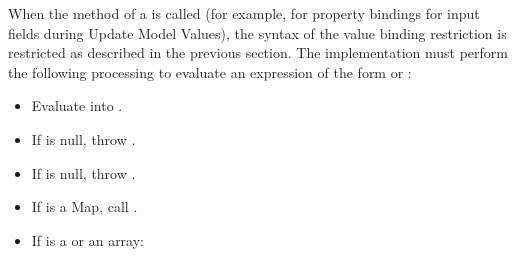 \foreignlanguage{english}{When the
}\foreignlanguage{english}{
method of a
}\foreignlanguage{english}{
is called (for example, for
}\foreignlanguage{english}{
property bindings for input fields during Update Model Values), the
syntax of the value binding restriction is restricted as described in
the previous section. The implementation must perform the following
processing to evaluate an expression of the form
}\foreignlanguage{english}{
or
}\foreignlanguage{english}{:}

\liststyleWWNumx
\begin{itemize}
\item \foreignlanguage{english}{Evaluate
}\foreignlanguage{english}{
into
}\foreignlanguage{english}{.
}
\item \foreignlanguage{english}{If
}\foreignlanguage{english}{
is null, throw
}\foreignlanguage{english}{.
}
\item \foreignlanguage{english}{If
}\foreignlanguage{english}{
is null, throw
}\foreignlanguage{english}{.
}
\item \foreignlanguage{english}{If
}\foreignlanguage{english}{
is a Map, call
}\foreignlanguage{english}{. }
\item \foreignlanguage{english}{If
}\foreignlanguage{english}{
is a
}\foreignlanguage{english}{
or an array: }


\end{itemize}
